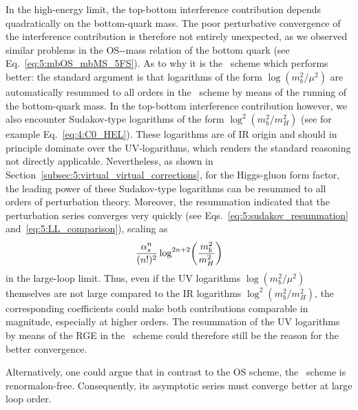 In the high-energy limit, the top-bottom interference contribution depends quadratically on the bottom-quark mass. The poor perturbative convergence of the interference contribution is therefore not entirely unexpected, as we observed similar problems in the \acs{OS}-\MS-mass relation of the bottom quark (see Eq.~\eqref{eq:5:mbOS_mbMS_5FS}).
As to why it is the \MS\ scheme which performs better: the standard argument is that logarithms of the form $\log\! \left(m_b^2/\mu^2\right)$ are automatically resummed to all orders in the \MS\ scheme by means of the running of the bottom-quark mass. In the top-bottom interference contribution however, we also encounter Sudakov-type logarithms of the form $\log^2\! \left(m_b^2/m_H^2 \right)$ (see for example Eq.~\eqref{eq:4:C0_HEL}). These logarithms are of \acs{IR} origin and should in principle dominate over the \acs{UV}-logarithms, which renders the standard reasoning not directly applicable. Nevertheless, as shown in Section~\ref{subsec:5:virtual_virtual_corrections}, for the Higgs-gluon form factor, the leading power of these Sudakov-type logarithms can be resummed to all orders of perturbation theory. Moreover, the resummation indicated that the perturbation series converges very quickly (see Eqs.~\eqref{eq:5:sudakov_resummation} and\ \eqref{eq:5:LL_comparison}), scaling as
\begin{equation}
\frac{\alpha_s^n}{(n!)^2} \log^{2n + 2}\! \left(\frac{m_b^2}{m_H^2} \right)
\end{equation}
in the large-loop limit. Thus, even if the \acs{UV} logarithms $\log\! \left(m_b^2/\mu^2\right)$ themselves are not large compared to the \acs{IR} logarithms $\log^2\! \left(m_b^2/m_H^2 \right)$, the corresponding coefficients could make both contributions comparable in magnitude, especially at higher orders. The resummation of the \acs{UV} logarithms by means of the \acs{RGE} in the \MS\ scheme could therefore still be the reason for the better convergence.

Alternatively, one could argue that in contrast to the \acs{OS} scheme, the \MS\ scheme is renormalon-free. Consequently, its asymptotic series must converge better at large loop order.

